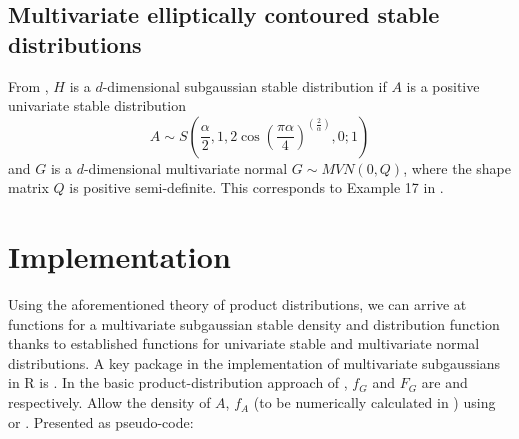 \subsection{Multivariate elliptically contoured stable distributions \label{sect:A:stable}}

From \citet{nolan2013multivariate}, $H$ is a $d$-dimensional
subgaussian stable distribution if $A$ is a positive univariate stable distribution
$$A \sim S\left( \frac{\alpha}{2}, 1, 2 \cos \left( \frac{\pi
      \alpha}{4} \right)^{\left(\frac{2}{\alpha}\right)} , 0;
  1\right)$$ and $G$ is a $d$-dimensional multivariate normal
$G \sim MVN( 0, Q)$, where the shape matrix $Q$ is positive semi-definite.
This corresponds to Example 17 in \citet{hamdan2000characterizing}.


\section{Implementation \label{sect:imp}}
Using the aforementioned theory of product distributions, we can
arrive at functions for a multivariate subgaussian stable density and
distribution function thanks to established functions for univariate
stable and multivariate normal distributions. A key package in the
implementation of multivariate subgaussians in R is 
\citep{mvtnorm2020package, mvtnorm2009book}. In the basic
product-distribution approach of , $f_G$ and
$F_G$ are  and 
respectively.  Allow the density of $A$, $f_A$ (to be numerically
calculated in ) using  or
  \citep{libstableRpackage}. Presented as pseudo-code:

